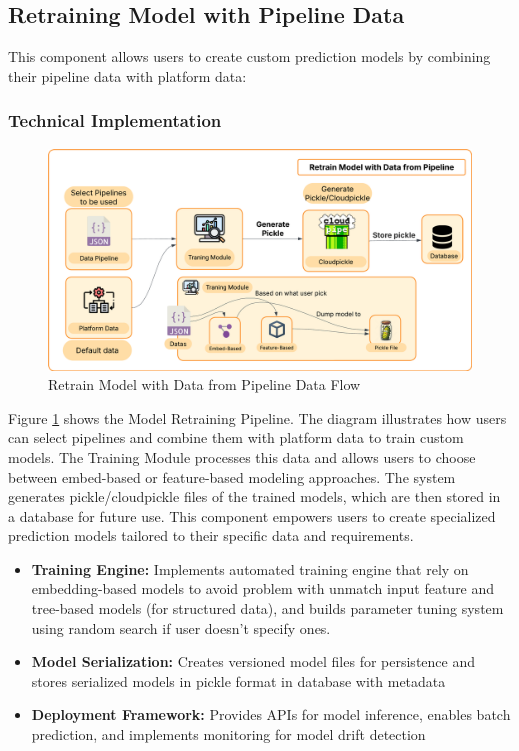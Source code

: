\subsection{Retraining Model with Pipeline Data}
This component allows users to create custom prediction models by combining their pipeline data with platform data:

\subsubsection{Technical Implementation}

\begin{figure}[htbp]
	\centering
	\includegraphics[width=1\textwidth]{assets/retrain-model-with-data-from-pipeline.png}
	\caption{Retrain Model with Data from Pipeline Data Flow}
	\label{fig:retrain-model-with-data-from-pipeline-data-flow}
\end{figure}

\noindent Figure \ref{fig:retrain-model-with-data-from-pipeline-data-flow} shows the Model Retraining Pipeline. The diagram illustrates how users can select pipelines and combine them with platform data to train custom models. The Training Module processes this data and allows users to choose between embed-based or feature-based modeling approaches. The system generates pickle/cloudpickle files of the trained models, which are then stored in a database for future use. This component empowers users to create specialized prediction models tailored to their specific data and requirements.

\begin{itemize}
    \item \textbf{Training Engine:} Implements automated training engine that rely on embedding-based models to avoid problem with unmatch input feature and tree-based models (for structured data), and builds parameter tuning system using random search if user doesn't specify ones.
    \item \textbf{Model Serialization:} Creates versioned model files for persistence and stores serialized models in pickle format in database with metadata
    \item \textbf{Deployment Framework:} Provides APIs for model inference, enables batch prediction, and implements monitoring for model drift detection
\end{itemize}

